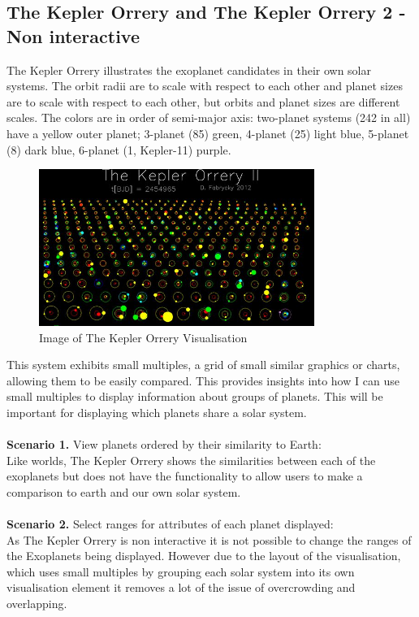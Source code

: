 \subsection{The Kepler Orrery and The Kepler Orrery 2 - Non interactive}
The Kepler Orrery \cite{orrery} illustrates the exoplanet candidates in their own solar systems. The orbit radii are to scale with respect to each other and planet sizes are to scale with respect to each other, but orbits and planet sizes are different scales. The colors are in order of semi-major axis: two-planet systems (242 in all) have a yellow outer planet; 3-planet (85) green, 4-planet (25) light blue, 5-planet (8) dark blue, 6-planet (1, Kepler-11) purple. 
\begin{figure}[h!]
  \centering
      \includegraphics[width=0.8\textwidth]{images/orrery.jpg}
  \caption{Image of The Kepler Orrery Visualisation}
\end{figure}
This system exhibits small multiples, a grid of small similar graphics or charts, allowing them to be easily compared. This provides insights into how I can use small multiples to display information about groups of planets. This will be important for displaying which planets share a solar system.
\\\\
{\bf Scenario 1.} View planets ordered by their similarity to Earth:\\
Like worlds, The Kepler Orrery shows the similarities between each of the exoplanets but does not have the functionality to allow users to make a comparison to earth and our own solar system.
\\\\
{\bf Scenario 2.} Select ranges for attributes of each planet displayed:\\
As The Kepler Orrery is non interactive it is not possible to change the ranges of the Exoplanets being displayed. However due to the layout of the visualisation, which uses small multiples by grouping each solar system into its own visualisation element it removes a lot of the issue of overcrowding and overlapping.
